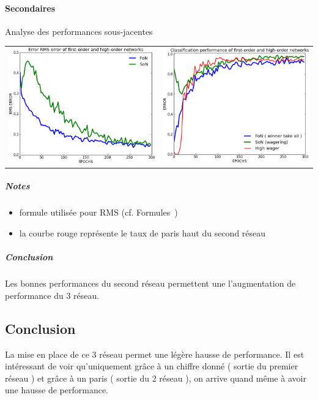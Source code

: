     \paragraph{Secondaires}
      Analyse des performances sous-jacentes
      \begin{center}
	\begin{tabular}{lr}
	  \hspace*{-1cm}
	  \includegraphics[width=250px]{data/expF1/rms.png}
	  &
	  \includegraphics[width=250px]{data/expF1/perf.png}
	\end{tabular}
      \end{center} 
      \subparagraph{Notes}
	\begin{itemize}
	  \item formule utilisée pour RMS (cf. Formules~)
	  \item la courbe rouge représente le taux de paris haut du second réseau
	\end{itemize}
      \subparagraph{Conclusion}
	Les bonnes performances du second réseau permettent une l'augmentation de performance du 3 réseau.


  \subsection{Conclusion}
  La mise en place de ce 3 réseau permet une légère hausse de performance. Il est intéressant de voir qu'uniquement
  grâce à un chiffre donné ( sortie du premier réseau ) et grâce à un paris ( sortie du 2 réseau ), on arrive 
  quand même à avoir une hausse de performance.
  
